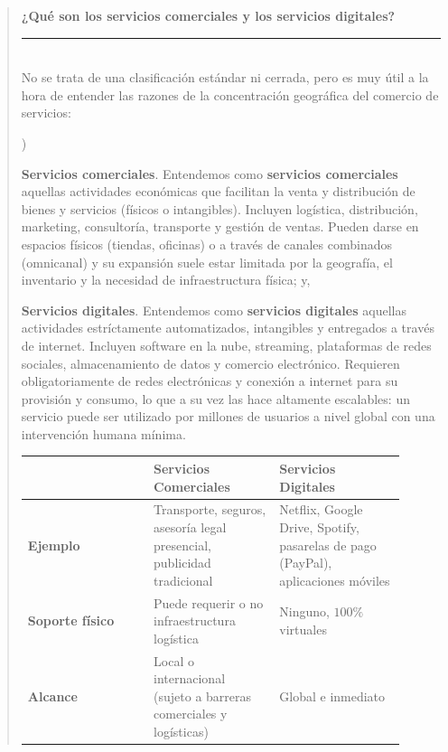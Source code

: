 \documentclass[10pt,a4paper]{article}
\newcounter{alphaitem}
\newenvironment{la}
      {\begin{list}{\alph{alphaitem})}{%
          \usecounter{alphaitem}%
          \setlength{\leftmargin}{1cm}%
          \setlength{\parskip}{3pt}%
          \setlength{\itemsep}{0pt}%
          \setlength{\parsep}{0pt}%
      }}
      {\end{list}}
\newenvironment{specialblock}[1]{%
      \begin{quote} %
      \small %
      \noindent\textbf{#1}\\[-0.3em] %
      \rule{\linewidth}{0.4pt}\\[0.6em]}{
      \end{quote}}
\begin{document}
\begin{specialblock}{¿Qué son los servicios comerciales y los servicios digitales?}
    No se trata de una clasificación estándar ni cerrada, pero es muy útil a la hora de entender las razones de la concentración geográfica del comercio de servicios:
    \begin{la}
        \item \textbf{Servicios comerciales}. Entendemos como \textbf{servicios comerciales} aquellas actividades económicas que facilitan la venta y distribución de bienes y servicios (físicos o intangibles). Incluyen logística, distribución, marketing, consultoría, transporte y gestión de ventas. Pueden darse en espacios físicos (tiendas, oficinas) o a través de canales combinados (omnicanal) y su expansión suele estar limitada por la geografía, el inventario y la necesidad de infraestructura física; y,
        \item \textbf{Servicios digitales}. Entendemos como \textbf{servicios digitales} aquellas actividades estríctamente automatizados, intangibles y entregados a través de internet. Incluyen software en la nube, streaming, plataformas de redes sociales, almacenamiento de datos y comercio electrónico. Requieren obligatoriamente de redes electrónicas y conexión a internet para su provisión y consumo, lo que a su vez las hace altamente escalables: un servicio puede ser utilizado por millones de usuarios a nivel global con una intervención humana mínima.
    \end{la}

    \begin{center}
    \begin{tabular}{|p{0.3\linewidth}|p{0.3\linewidth}|p{0.3\linewidth}|}
    \hline
     & \textbf{Servicios Comerciales} & \textbf{Servicios Digitales} \\
    \hline
    \textbf{Ejemplo} & Transporte, seguros, asesoría legal presencial, publicidad tradicional & Netflix, Google Drive, Spotify, pasarelas de pago (PayPal), aplicaciones móviles \\
    \hline
    \textbf{Soporte físico} & Puede requerir o no infraestructura logística & Ninguno, $100\%$ virtuales \\
    \hline
    \textbf{Alcance} & Local o internacional (sujeto a barreras comerciales y logísticas) & Global e inmediato\\
    \hline
    \end{tabular}
    \end{center}
\end{specialblock}
\end{document}
